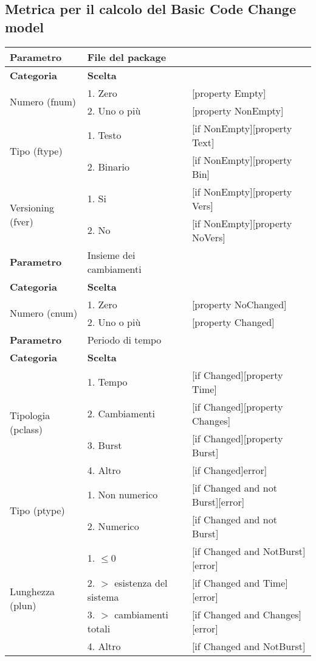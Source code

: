 \subsection{Metrica per il calcolo del Basic Code Change model}
		
\begin{tabular}{|p{4cm}|p{4cm}p{5cm}|}
	\hline
	\cellcolor{Gray} \textbf{Parametro}		& File del package	&											\tabularnewline
	\hline
	\rowcolor{Gray}
	\textbf{Categoria} 						& \textbf{Scelta}			&									\tabularnewline
	\hline
	\multirow{2}{*}{Numero (fnum)} 			& 1. Zero 					&	[property Empty] 				\tabularnewline
	\cline{2-3}
											& 2. Uno o più				&	[property NonEmpty]				\tabularnewline
	\hline
	\multirow{2}{*}{Tipo (ftype)} 			& 1. Testo					&	[if NonEmpty][property Text] 	\tabularnewline
	\cline{2-3}
											& 2. Binario				&	[if NonEmpty][property Bin]		\tabularnewline
	\hline
	\multirow{2}{*}{Versioning (fver)}		& 1. Si						&	[if NonEmpty][property Vers]	\tabularnewline
	\cline{2-3}
											& 2. No						&	[if NonEmpty][property NoVers]	\tabularnewline
	\hline
	
	
	\cellcolor{Gray} \textbf{Parametro}		& Insieme dei cambiamenti	&									\tabularnewline
	\hline
	\rowcolor{Gray}
	\textbf{Categoria} 						& \textbf{Scelta}			&									\tabularnewline
	\hline
	\multirow{2}{*}{Numero (cnum)} 			& 1. Zero 					&	[property NoChanged]			\tabularnewline
	\cline{2-3}
											& 2. Uno o più				&	[property Changed]				\tabularnewline
	\hline	
	
	
	\cellcolor{Gray} \textbf{Parametro}		& Periodo di tempo			&									\tabularnewline
	\hline
	\rowcolor{Gray}
	\textbf{Categoria} 						& \textbf{Scelta}			&									\tabularnewline
	\hline
	\multirow{4}{*}{Tipologia (pclass)} 	& 1. Tempo 					&	[if Changed][property Time]				 	\tabularnewline
	\cline{2-3}
											& 2. Cambiamenti			&	[if Changed][property Changes]				\tabularnewline
	\cline{2-3}
											& 3. Burst 					&	[if Changed][property Burst]				\tabularnewline
	\cline{2-3}
											& 4. Altro 					&	[if Changed]error]							\tabularnewline
	\hline
	\multirow{2}{*}{Tipo (ptype)} 			& 1. Non numerico 			&	[if Changed and not Burst][error]		 	\tabularnewline
	\cline{2-3}
											& 2. Numerico 				&	[if Changed and not Burst]					\tabularnewline
	\hline
	\multirow{4}{*}{Lunghezza (plun)} 		& 1. $\leq 0$					&	[if Changed and NotBurst][error] 		\tabularnewline
	\cline{2-3}
											& 2. $>$ esistenza del sistema 	& 	[if Changed and Time][error]			\tabularnewline
	\cline{2-3}
											& 3. $>$ cambiamenti totali		&	[if Changed and Changes][error]			\tabularnewline
	\cline{2-3}
											& 4. Altro						&	[if Changed and NotBurst]				\tabularnewline
	\hline
\end{tabular}

